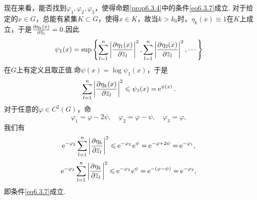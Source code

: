 现在来看，能否找到$\varphi_1,\varphi_2,\varphi_3$，使得命题\ref{prop6.3.4}中的条件\eqref{eq6.3.7}成立.
对于给定的$x\in G$，总能有紧集$K\subset G$，使得$x\in K$，故当$k>k_0$时，$\eta_k(x)\equiv1$在$K$上成立，于是$\frac{\partial \eta_k(x)}{\partial {}\mkern1mu\overline{\mkern-1muz}_l}=0$.因此
\[\psi_1(x)=\sup\left\{\sum_{l=1}^{n}\left|\frac{\partial \eta_1(x)}{\partial {}\mkern1mu\overline{\mkern-1muz}_l}\right|^2,\sum_{l=1}^{n}\left|\frac{\partial \eta_2(x)}{\partial {}\mkern1mu\overline{\mkern-1muz}_l}\right|^2,\cdots\right\}\]
在$G$上有定义且取正值.命$\psi(x)=\log\psi_1(x)$，于是
\[\sum_{l=1}^{n}\left|\frac{\partial \eta_k(x)}{\partial {}\mkern1mu\overline{\mkern-1muz}_l}\right|^2\leqslant\psi_1(x)=\operatorname{\!\!\;\mathrm e}^{\psi(x)}.\]
对于任意的$\varphi\in C^2(G)$，命
\[\varphi_1=\varphi-2\psi,\quad \varphi_2=\varphi-\psi,\quad \varphi_3=\varphi,\]
我们有
\[\ee^{-\varphi_2}\sum_{l=1}^{n}\left|\pp{\eta_k}{\bar{z}_l}\right|^2\le\ee^{-\varphi_2}\ee^\psi=\ee^{-\varphi+2\psi}=\ee^{-\varphi_1},\]
\[\ee^{-\varphi_3}\sum_{l=1}^{n}\left|\pp{\eta_k}{\bar{z}_l}\right|^2\le\ee^{-\varphi_3}\ee^\psi=\ee^{-(\varphi-\psi)}=\ee^{-\varphi_2},\]
即条件\eqref{eq6.3.7}成立.


